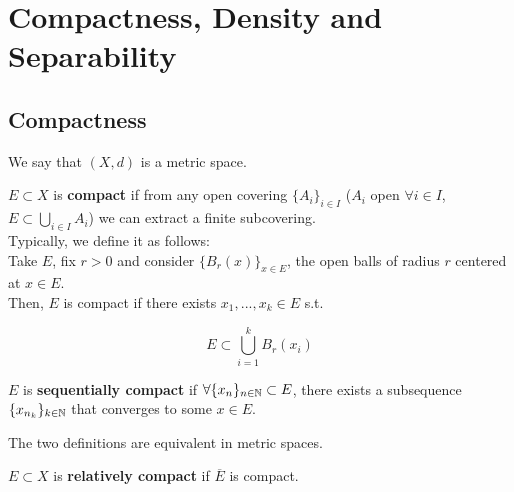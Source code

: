 \chapter{Compactness, Density and Separability}

\section{Compactness}

We say that $(X, d)$ is a metric space.\\

\begin{fdefinition}
    $E \subset X$ is \textbf{compact} if from any open covering 
    $\{A_i\}_{i \in I}$ ($A_i$ open $\forall i \in I$, $E \subset \bigcup_{i \in I} A_i$)
    we can extract a finite subcovering.\\

    Typically, we define it as follows:\\

    Take $E$, fix $r > 0$ and consider $\{B_r(x)\}_{x \in E}$, the open balls of radius $r$ centered at $x \in E$.\\
    Then, $E$ is compact if there exists $x_1, ..., x_k \in E$ s.t.

    $$E \subset \bigcup_{i=1}^k B_r(x_i)$$

\end{fdefinition}

\vspace{1em}

\begin{fdefinition}
    $E$ is \textbf{sequentially compact} if $\forall \{x_n\}_{n \in \mathbb{N}} \subset E$, there
    exists a subsequence $\{x_{n_k}\}_{k \in \mathbb{N}}$ that converges to some $x \in E$.\\
\end{fdefinition}

\begin{fremark}
    The two definitions are equivalent in metric spaces.
\end{fremark}

\vspace{1em}

\begin{fdefinition}
    $E \subset X$ is \textbf{relatively compact} if $\overline{E}$ is compact.
\end{fdefinition}

\vspace{1em}

